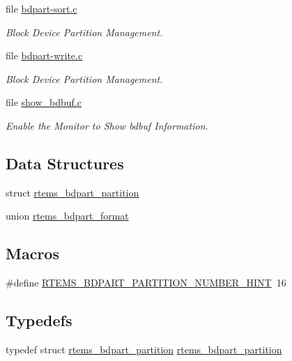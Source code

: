 \begin{DoxyCompactItemize}
file \mbox{\hyperlink{bdpart-sort_8c}{bdpart-\/sort.\+c}}
\begin{DoxyCompactList}\small\item\em Block Device Partition Management. \end{DoxyCompactList}\item 
file \mbox{\hyperlink{bdpart-write_8c}{bdpart-\/write.\+c}}
\begin{DoxyCompactList}\small\item\em Block Device Partition Management. \end{DoxyCompactList}\item 
file \mbox{\hyperlink{show__bdbuf_8c}{show\+\_\+bdbuf.\+c}}
\begin{DoxyCompactList}\small\item\em Enable the Monitor to Show bdbuf Information. \end{DoxyCompactList}\end{DoxyCompactItemize}
\subsection*{Data Structures}
\begin{DoxyCompactItemize}
\item 
struct \mbox{\hyperlink{structrtems__bdpart__partition}{rtems\+\_\+bdpart\+\_\+partition}}
\item 
union \mbox{\hyperlink{unionrtems__bdpart__format}{rtems\+\_\+bdpart\+\_\+format}}
\end{DoxyCompactItemize}
\subsection*{Macros}
\begin{DoxyCompactItemize}
\item 
\#define \mbox{\hyperlink{group__rtems__bdpart_gadd7733262575d66342e79ebafbd3ec78}{R\+T\+E\+M\+S\+\_\+\+B\+D\+P\+A\+R\+T\+\_\+\+P\+A\+R\+T\+I\+T\+I\+O\+N\+\_\+\+N\+U\+M\+B\+E\+R\+\_\+\+H\+I\+NT}}~16
\end{DoxyCompactItemize}
\subsection*{Typedefs}
\begin{DoxyCompactItemize}
\item 
typedef struct \mbox{\hyperlink{structrtems__bdpart__partition}{rtems\+\_\+bdpart\+\_\+partition}} \mbox{\hyperlink{group__rtems__bdpart_ga332cb2d1be444f20c2daa9d7382f8e2c}{rtems\+\_\+bdpart\+\_\+partition}}
\end{DoxyCompactItemize}
